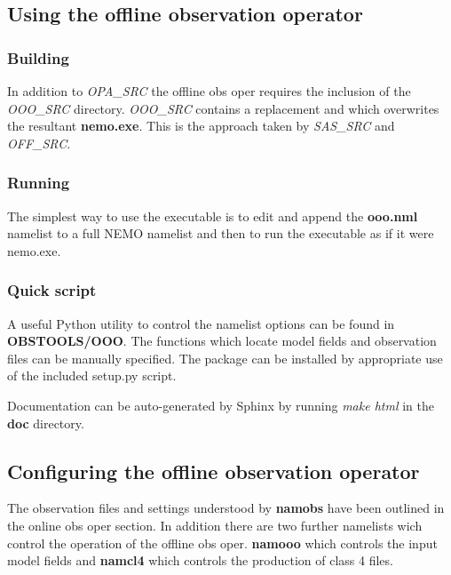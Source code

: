 \documentclass[../tex_main/NEMO_manual]{subfiles}
\begin{document}
\subsection{Using the offline observation operator}

\subsubsection{Building}

In addition to \emph{OPA\_SRC} the offline obs oper requires the inclusion of the \emph{OOO\_SRC} directory.
\emph{OOO\_SRC} contains a replacement  and  which
overwrites the resultant \textbf{nemo.exe}.
This is the approach taken by \emph{SAS\_SRC} and \emph{OFF\_SRC}.

\subsubsection{Running}

The simplest way to use the executable is to edit and append the \textbf{ooo.nml} namelist to
a full NEMO namelist and then to run the executable as if it were nemo.exe. 

\subsubsection{Quick script}

A useful Python utility to control the namelist options can be found in \textbf{OBSTOOLS/OOO}.
The functions which locate model fields and observation files can be manually specified.
The package can be installed by appropriate use of the included setup.py script.

Documentation can be auto-generated by Sphinx by running \emph{make html} in the \textbf{doc} directory.

\subsection{Configuring the offline observation operator}
The observation files and settings understood by \textbf{namobs} have been outlined in the online obs oper section.
In addition there are two further namelists wich control the operation of the offline obs oper.
\textbf{namooo} which controls the input model fields and \textbf{namcl4} which
controls the production of class 4 files. 
\end{document}
